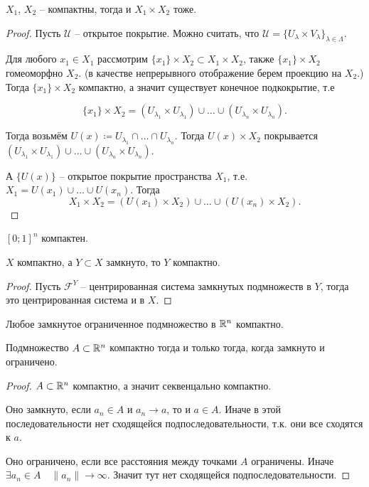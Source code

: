 \begin{theorem}
    $X_1$, $X_2$ -- компактны, тогда и $X_1 \times X_2$ тоже.
\end{theorem}
\begin{proof}
    Пусть $\mathcal U$ -- открытое покрытие. Можно считать, что $\mathcal U = \{U_{\lambda}\times V_\lambda\}_{\lambda\in\Lambda}.$
    
    Для любого $x_1 \in X_1$ рассмотрим $\{x_1\}\times X_2 \subset X_1\times X_2$, также $\{x_1\} \times X_2 $ гомеоморфно $ X_2.$ (в качестве непрерывного отображение берем проекцию на $X_2$.) Тогда $\{x_1\}\times X_2$ компактно, а значит существует конечное подкокрытие, т.е 

    \begin{equation}
         \{x_1\}\times X_2 = (U_{\lambda_1}\times U_{\lambda_1})\cup\ldots\cup(U_{\lambda_n}\times U_{\lambda_n}).
    \end{equation}

    Тогда возьмём $U(x) \coloneq U_{\lambda_1}\cap \ldots \cap U_{\lambda_n}.$ Тогда $U(x) \times X_2$ покрывается $(U_{\lambda_1}\times U_{\lambda_1})\cup\ldots\cup(U_{\lambda_n}\times U_{\lambda_n}).$ 

    А $\{U(x)\}$ -- открытое покрытие пространства $X_1$, т.е. $X_1 = U(x_1) \cup \ldots \cup U(x_n).$ Тогда 
    \begin{equation}
        X_1 \times X_2 = (U(x_1)\times X_2)\cup\ldots\cup (U(x_n)\times X_2).
    \end{equation}
\end{proof}

\begin{corollary}
    $[0;1]^n$ компактен.
\end{corollary}

\begin{theorem}
    $X$ компактно, а $Y \subset X$ замкнуто, то $Y$ компактно.
\end{theorem}
\begin{proof}
    Пусть $\mathcal F^Y$ -- центрированная система замкнутых подмножеств в $Y$, тогда это центрированная система и в $X$.
\end{proof}

\begin{corollary}
    Любое замкнутое ограниченное подмножество в $\mathbb R^n$ компактно.
\end{corollary}

\begin{theorem}
    Подмножество $A\subset \mathbb R^n$ компактно тогда и только тогда, когда замкнуто и ограничено.
\end{theorem}
\begin{proof}
    $A\subset \mathbb R^n$ компактно, а значит секвенцально компактно. 
    
    Оно замкнуто, если $a_n \in A$ и $a_n \to a$, то и $a\in A.$ Иначе в этой последовательности нет сходящейся подпоследовательности, т.к. они все сходятся к $a.$

    Оно ограничено, если все расстояния между точками $A$ ограничены. Иначе $\exists a_n \in A\quad \|a_n\| \to \infty.$ Значит тут нет сходящейся подпоследовательности.
\end{proof}